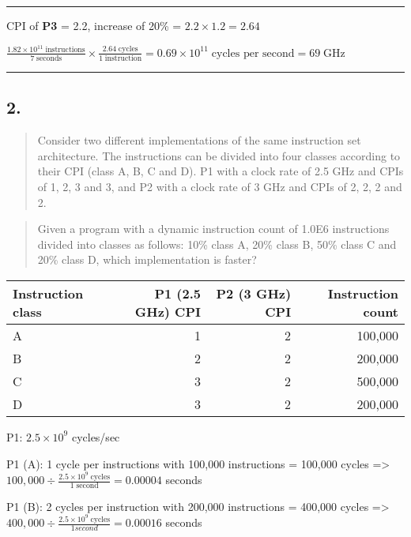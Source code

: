 \documentclass[]{article}
\begin{document}
\begin{center}\rule{0.5\linewidth}{\linethickness}\end{center}

CPI of \textbf{P3} = 2.2, increase of 20\% = \(2.2 \times 1.2 = 2.64\)

\(\frac{1.82 \times 10^{11} \;\text{instructions}}{7 \;\text{seconds}} \times \frac{2.64 \;\text{cycles}}{1 \;\text{instruction}} = 0.69 \times 10^{11} \;\text{cycles per second} = 69 \; \text{GHz}\)

\begin{center}\rule{0.5\linewidth}{\linethickness}\end{center}

\subsection{2.}\label{header-n4790}

\begin{quote}
Consider two different implementations of the same instruction set
architecture. The instructions can be divided into four classes
according to their CPI (class A, B, C and D). P1 with a clock rate of
2.5 GHz and CPIs of 1, 2, 3 and 3, and P2 with a clock rate of 3 GHz and
CPIs of 2, 2, 2 and 2.
\end{quote}

\begin{quote}
Given a program with a dynamic instruction count of 1.0E6 instructions
divided into classes as follows: 10\% class A, 20\% class B, 50\% class
C and 20\% class D, which implementation is faster?
\end{quote}

\begin{longtable}[]{@{}lrrr@{}}
\toprule
Instruction class & P1 (2.5 GHz) CPI & P2 (3 GHz) CPI & Instruction
count\tabularnewline
\midrule
\endhead
A & 1 & 2 & 100,000\tabularnewline
B & 2 & 2 & 200,000\tabularnewline
C & 3 & 2 & 500,000\tabularnewline
D & 3 & 2 & 200,000\tabularnewline
\bottomrule
\end{longtable}

P1: \(2.5 \times 10^9\) cycles/sec

P1 (A): 1 cycle per instructions with 100,000 instructions = 100,000
cycles =\textgreater{}
\(100,000 \div \frac{2.5 \times 10^9 \;\text{cycles}}{1 \;\text{second}} = 0.00004\)
seconds

P1 (B): 2 cycles per instruction with 200,000 instructions = 400,000
cycles =\textgreater{}
\(400,000 \div \frac{2.5 \times 10^9 \;\text{cycles}}{1 second} = 0.00016\)
seconds
\end{document}

